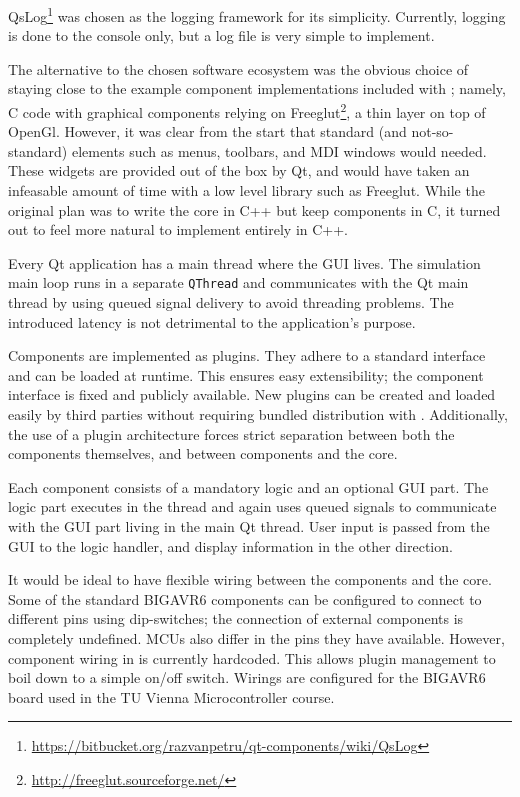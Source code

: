 QsLog\footnote{\url{https://bitbucket.org/razvanpetru/qt-components/wiki/QsLog}}
was chosen as the logging framework for its simplicity. Currently, logging is done
to the console only, but a log file is very simple to implement.

The alternative to the chosen software ecosystem was the obvious choice of
staying close to the example component implementations included with \simavr;
namely, C code with graphical components relying on Freeglut\footnote{
%
\url{http://freeglut.sourceforge.net/}
%
}, a thin layer on top of OpenGl. However, it was clear from the start that
standard (and not-so-standard) elements such as menus, toolbars, and \ac{MDI}
windows would needed. These widgets are provided out of the box by Qt, and
would have taken an infeasable amount of time with a low level library such as
Freeglut. While the original plan was to write the \qsimavr core in C++ but keep
components in C, it turned out to feel more natural to implement entirely in C++.

Every Qt application has a main thread where the \ac{GUI} lives. The \simavr
simulation main loop runs in a separate \lstinline|QThread| and communicates
with the Qt main thread by using queued signal delivery to avoid threading
problems. The introduced latency is not detrimental to the application's purpose.

Components are implemented as plugins. They adhere to a standard interface and
can be loaded at runtime. This ensures easy extensibility; the component interface
is fixed and publicly available. New plugins can be created and loaded easily by
third parties without requiring bundled distribution with \qsimavr. Additionally,
the use of a plugin architecture forces strict separation between both
the components themselves, and between components and the core.

Each component consists of a mandatory logic and an optional \ac{GUI} part.
The logic part executes in the \simavr thread and again uses queued signals
to communicate with the \ac{GUI} part living in the main Qt thread. User input
is passed from the \ac{GUI} to the logic handler, and display information in the
other direction.

It would be ideal to have flexible wiring between the components and the core.
Some of the standard BIGAVR6 components can be configured to connect to different
pins using dip-switches; the connection of external components is completely
undefined. \acp{MCU} also differ in the pins they have available. However,
component wiring in \qsimavr is currently hardcoded. This allows plugin management
to boil down to a simple on/off switch. Wirings are configured for the BIGAVR6
board used in the \ac{TU} Vienna Microcontroller course.
